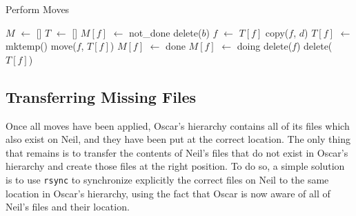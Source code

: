 \documentclass[11pt]{llncs}
\newcommand*\Let[2]{\State #1 $\gets$ #2}
\newcommand{\rsync}{\texttt{rsync}\xspace}
\begin{document}
\begin{algorithm}
  \caption{Perform Moves}
  \label{alg:moves}
  \begin{algorithmic}[1]
    \Statex
    \Let{$M$}{[]}
    \Let{$T$}{[]}
      \Let{$M[f]$}{not\_done}
    \EndFor
          \State delete($b$) 
        \Else
          \State {} 
        \EndIf
      \EndIf
        \Let{$f$}{$T[f]$}
      \EndIf
      \State copy($f$, $d$)
    \EndFunction
        \State \Return {}
      \EndIf
        \Let{$T[f]$}{mktemp()}
        \State move($f$, $T[f]$)
        \Let{$M[f]$}{done}
        \State \Return {}
      \EndIf
      \Let{$M[f]$}{doing}
          \State {} 
        \EndIf
      \EndFor
        \State delete($f$)
      \EndIf
        \State delete($T[f]$)
      \EndIf
    \EndFunction

      \State {}
    \EndFor
  \end{algorithmic}
\end{algorithm}

\subsection{Transferring Missing Files}
\label{transferring}

Once all moves have been applied, Oscar's hierarchy contains all of its files
which also exist on Neil, and they have been put at the correct location. The
only thing that remains is to transfer the contents of Neil's files that do not
exist in Oscar's hierarchy and create those files at the right position. To do
so, a simple solution is to use \rsync to synchronize explicitly the correct
files on Neil to the same location in Oscar's hierarchy, using the fact that
Oscar is now aware of all of Neil's files and their location.
\end{document}
